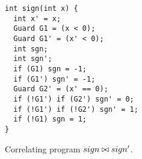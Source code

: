 \begin{figure}
\centering
\begin{lstlisting}
int sign(int x) {
  int x' = x;
  Guard G1 = (x < 0);
  Guard G1' = (x' < 0);
  int sgn;
  int sgn';
  if (G1) sgn = -1;
  if (G1') sgn' = -1;
  Guard G2' = (x' == 0);
  if (!G1') if (G2') sgn' = 0;
  if (!G1') if (!G2') sgn' = 1;
  if (!G1) sgn = 1;
}
\end{lstlisting}
\caption{Correlating program $sign \bowtie sign'$.}
\end{figure}
